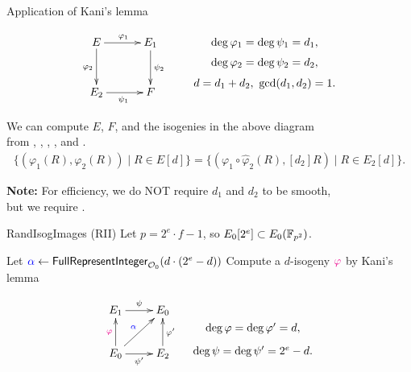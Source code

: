 \begin{frame}{Application of Kani's lemma}

    \vspace{-10pt}
    \begin{align*}
        \xymatrix@C=30pt@R=30pt{
            E \ar[r]^{\varphi_1} \ar[d]_{\varphi_2} & E_1 \ar[d]^{\psi_2}\\
            E_2 \ar[r]_{\psi_1} & F
        }
        \qquad
        \xymatrix@R=0.3em{
            \deg\varphi_1 = \deg\psi_1 = d_1,\\
            \deg\varphi_2 = \deg\psi_2 = d_2,\\
            d = d_1 + d_2,\ \gcd(d_1, d_2) = 1.
        }
    \end{align*}

    \vspace{10pt}
    We can compute $E$, $F$, and the isogenies in the above diagram\\
    from , , , , and .
    \begin{align*}
        \{(\varphi_1(R), \varphi_2(R)) \mid R \in E[d]\}
        = \{(\varphi_1\circ\hat{\varphi}_2(R), [d_2]R) \mid R \in E_2[d]\}.
    \end{align*}
   
    \vspace{10pt}
    \textbf{Note:}
    For efficiency, we do NOT require $d_1$ and $d_2$ to be smooth,\\
     but we require .
\end{frame}

\begin{frame}{RandIsogImages (RII)}
    Let $p = 2^e \cdot f - 1$, so $E_0[2^e] \subset E_0(\mathbb{F}_{p^2})$.

    \vspace{5pt}
    \begin{algorithm}[H]
        \caption{\textsf{RandIsogImages} (in \textbf{QFESTA} \cite{C:NakOnu24})}
        \BlankLine
        Let $\textcolor{blue}{\alpha} \leftarrow \textsf{FullRepresentInteger}_{\mathcal{O}_0}(d\cdot(2^{e} - d))$\;
        Compute a $d$-isogeny $\textcolor{magenta}{\varphi}$ by Kani's lemma\;
        \Return{$\varphi$}\;
    \end{algorithm}

    \vspace*{5pt}
    \begin{equation*}
        \xymatrix{
            E_1 \ar[r]^{\psi} & E_0\\
            E_0 \ar[u]^{\magenta{\varphi}} \ar[ur]^{\blue{\alpha}} \ar[r]_{\psi'} & E_2 \ar[u]_{\varphi'}
        }
        \hspace*{10pt}
        \xymatrix@R=5pt{
            \\
            \deg\varphi = \deg\varphi' = d,\\
            \deg\psi = \deg\psi' = 2^{e} - d.
        }
    \end{equation*}
\end{frame}